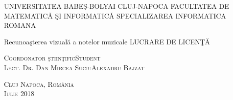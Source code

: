 \begin{titlepage}
	\begin{center}
		\vspace{0.5cm}
		\Large \textsc{UNIVERSITATEA BABEŞ-BOLYAI CLUJ-NAPOCA FACULTATEA DE MATEMATICǍ ŞI INFORMATICǍ 
		SPECIALIZAREA INFORMATICA ROMANA }

		\vfill

		\Huge Recunoaşterea vizuală a notelor muzicale
		\Large LUCRARE DE LICENŢĂ

		\vfill

		\Large
		\textsc{Coordonator ştiinţific}\hfill \textsc{Student}
		\\
		\large
		\textsc{Lect. Dr. Dan Mircea Suciu}\hfill \textsc{Alexadru Bajzat}
	
		\vspace{1.5cm}
		\textsc{Cluj Napoca, România}\\
		\textsc{Iulie 2018}

	\end{center}
\end{titlepage}
 
